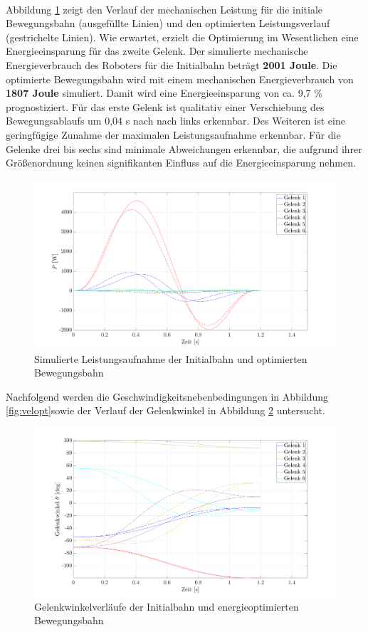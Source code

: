 \\
Abbildung \ref{fig:popt} zeigt den Verlauf der mechanischen Leistung für die initiale Bewegungsbahn (ausgefüllte Linien) und den optimierten Leistungsverlauf (gestrichelte Linien). Wie erwartet, erzielt die Optimierung im Wesentlichen eine Energieeinsparung für das zweite Gelenk. Der simulierte mechanische Energieverbrauch des Roboters für die Initialbahn beträgt \textbf{2001 Joule}. Die optimierte Bewegungsbahn wird mit einem mechanischen Energieverbrauch von \textbf{1807 Joule} simuliert. Damit wird eine Energieeinsparung von ca. 9,7 \% prognostiziert. Für das erste Gelenk ist qualitativ einer Verschiebung des Bewegungsablaufs um 0,04 s nach nach links erkennbar. Des Weiteren ist eine geringfügige Zunahme der maximalen Leistungsaufnahme erkennbar. Für die Gelenke drei bis sechs sind minimale Abweichungen erkennbar, die aufgrund ihrer Größenordnung keinen signifikanten Einfluss auf die Energieeinsparung nehmen. 
%
\begin{figure}[tbph]
	\centering
	\includegraphics[width=1\linewidth]{images/Optimierungsergebnisse_up/popt}
	\caption{Simulierte Leistungsaufnahme der Initialbahn und optimierten Bewegungsbahn}
	\label{fig:popt}
\end{figure}
%
Nachfolgend werden die Geschwindigkeitsnebenbedingungen in Abbildung \ref{fig:velopt}sowie der Verlauf der Gelenkwinkel in Abbildung \ref{fig:posopt} untersucht. 
%
\begin{figure}[tbph]
	\centering
	\includegraphics[width=1\linewidth]{images/Optimierungsergebnisse_up/posopt}
	\caption{Gelenkwinkelverläufe der Initialbahn und energieoptimierten Bewegungsbahn}
	\label{fig:posopt}
\end{figure}
